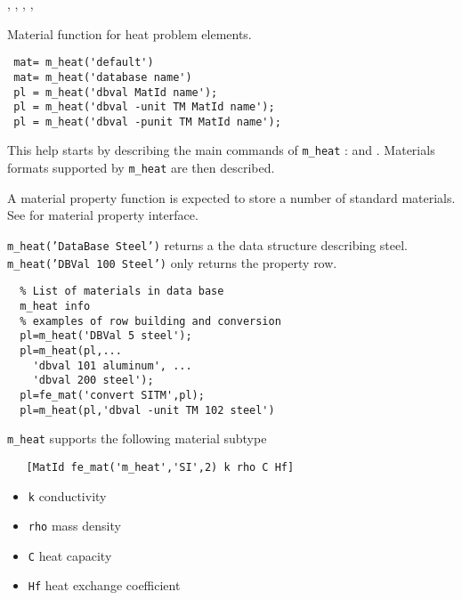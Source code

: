 
  , , \femat, \pshell, 



 Material function for heat problem elements.

\rsyntax\begin{verbatim}
 mat= m_heat('default') 
 mat= m_heat('database name') 
 pl = m_heat('dbval MatId name');
 pl = m_heat('dbval -unit TM MatId name');
 pl = m_heat('dbval -punit TM MatId name');
\end{verbatim}


This help starts by describing the main commands of {\tt m\_heat} :  and . Materials formats supported by {\tt m\_heat} are then described.

\ruic{m\_heat}{Database}{,Dbval] [-unit TY] [,MatiD]] Name} %

A material property function is expected to store a number of standard materials. See  for material property interface.

{\tt m\_heat('DataBase Steel')} returns a the data structure describing steel.\\
{\tt m\_heat('DBVal 100 Steel')} only returns the property row. 

\begin{verbatim}
  % List of materials in data base
  m_heat info
  % examples of row building and conversion
  pl=m_heat('DBVal 5 steel');
  pl=m_heat(pl,...
    'dbval 101 aluminum', ...
    'dbval 200 steel');
  pl=fe_mat('convert SITM',pl);
  pl=m_heat(pl,'dbval -unit TM 102 steel')
\end{verbatim}%

{\tt m\_heat} supports the following material subtype\vs\vs


\begin{verbatim}
   [MatId fe_mat('m_heat','SI',2) k rho C Hf]
\end{verbatim}

\begin{itemize}
\item {\tt k} conductivity
\item {\tt rho} mass density
\item {\tt C}  heat capacity
\item {\tt Hf} heat exchange coefficient
\end{itemize}

